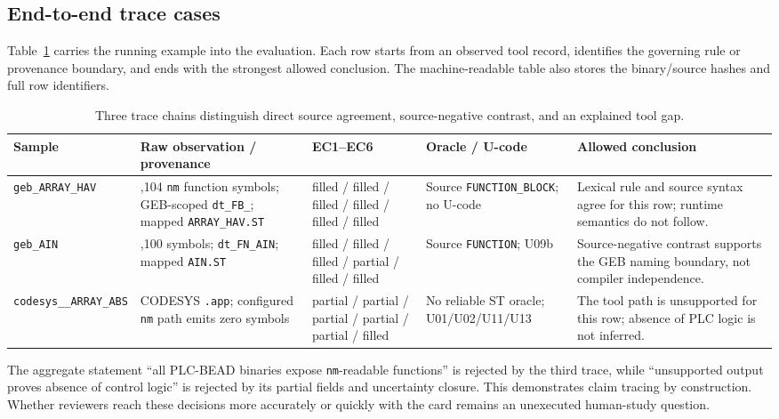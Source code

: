 \documentclass[manuscript,screen,review]{acmart}
\begin{document}
\subsection{End-to-end trace cases}

Table~\ref{tab:trace_cases} carries the running example into the evaluation. Each row starts from an observed tool record, identifies the governing rule or provenance boundary, and ends with the strongest allowed conclusion. The machine-readable table also stores the binary/source hashes and full row identifiers.

\begin{table}[t]
\centering
\scriptsize
\caption{Three trace chains distinguish direct source agreement, source-negative contrast, and an explained tool gap.}
\label{tab:trace_cases}
\begin{tabularx}{\textwidth}{>{\raggedright\arraybackslash}p{}>{\raggedright\arraybackslash}p{}>{\raggedright\arraybackslash}p{}>{\raggedright\arraybackslash}p{}>{\raggedright\arraybackslash}X}
\toprule
Sample & Raw observation / provenance & EC1--EC6 & Oracle / U-code & Allowed conclusion \\
\midrule
\texttt{geb\_ARRAY\_HAV} & 1,104 \texttt{nm} function symbols; GEB-scoped \texttt{dt\_FB\_}; mapped \texttt{ARRAY\_HAV.ST} & filled / filled / filled / filled / filled / filled & Source \texttt{FUNCTION\_BLOCK}; no U-code & Lexical rule and source syntax agree for this row; runtime semantics do not follow. \\
\texttt{geb\_AIN} & 1,100 symbols; \texttt{dt\_FN\_AIN}; mapped \texttt{AIN.ST} & filled / filled / filled / partial / filled / filled & Source \texttt{FUNCTION}; U09b & Source-negative contrast supports the GEB naming boundary, not compiler independence. \\
\texttt{codesys\_\_ARRAY\_ABS} & CODESYS \texttt{.app}; configured \texttt{nm} path emits zero symbols & partial / partial / partial / partial / partial / filled & No reliable ST oracle; U01/U02/U11/U13 & The tool path is unsupported for this row; absence of PLC logic is not inferred. \\
\bottomrule
\end{tabularx}
\end{table}

The aggregate statement ``all PLC-BEAD binaries expose \texttt{nm}-readable functions'' is rejected by the third trace, while ``unsupported output proves absence of control logic'' is rejected by its partial fields and uncertainty closure. This demonstrates claim tracing by construction. Whether reviewers reach these decisions more accurately or quickly with the card remains an unexecuted human-study question.
\end{document}
